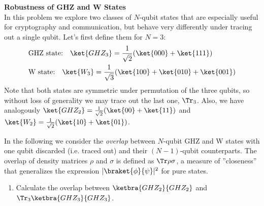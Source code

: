 \begin{exercises}
\item {\bf Robustness of GHZ and W States}\label{ex:robust-GHZ}\\
In this problem we explore two classes of $N$-qubit states that are especially useful for cryptography and communication, but behave very differently under tracing out a single qubit. Let's first define them for $N=3$:
\begin{align*}
& \text{GHZ state:} \quad \ket{GHZ_3} = \frac{1}{\sqrt{2}} (\ket{000}+\ket{111}) \\
& \text{W state:} \quad \ket{W_3} = \frac{1}{\sqrt{3}} (\ket{100}+\ket{010}+\ket{001})
\end{align*}
Note that both states are symmetric under permutation of the three qubits, so without loss of generality we may trace out the last one, $\Tr_3$. Also, we have analogously $\ket{GHZ_2}=\frac{1}{\sqrt{2}} (\ket{00}+\ket{11})$ and $\ket{W_2}=\frac{1}{\sqrt{2}} (\ket{10}+\ket{01})$.

In the following we consider the \textit{overlap} between $N$-qubit GHZ and W states with one qubit discarded (i.e. traced out) and their $(N-1)$-qubit counterparts. The overlap of density matrices $\rho$ and $\sigma$ is defined as $\Tr \rho\sigma$, a measure of ''closeness'' that generalizes the expression $|\braket{\phi}{\psi}|^2$ for pure states.
\begin{enumerate}
\item Calculate the overlap between $\ketbra{GHZ_2}{GHZ_2}$ and $\Tr_3\ketbra{GHZ_3}{GHZ_3}$.


\end{enumerate}
\end{exercises}
